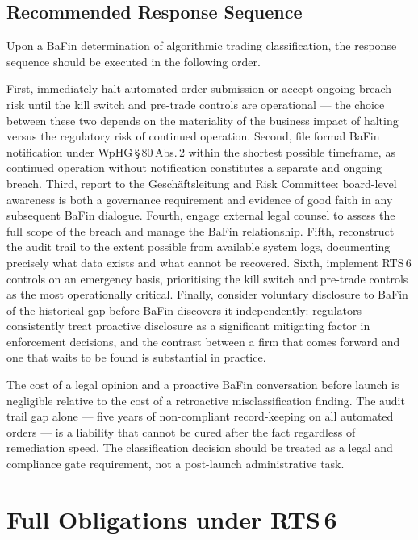 \documentclass[12pt,a4paper]{report}
\begin{document}
\subsection{Recommended Response Sequence}

Upon a BaFin determination of algorithmic trading classification, the response
sequence should be executed in the following order.

First, immediately halt automated order submission or accept ongoing breach risk until
the kill switch and pre-trade controls are operational --- the choice between these two
depends on the materiality of the business impact of halting versus the regulatory risk
of continued operation. Second, file formal BaFin notification under WpHG\,\S\,80\,Abs.\,2
within the shortest possible timeframe, as continued operation without notification
constitutes a separate and ongoing breach. Third, report to the Gesch{\"a}ftsleitung and
Risk Committee: board-level awareness is both a governance requirement and evidence of
good faith in any subsequent BaFin dialogue. Fourth, engage external legal counsel to
assess the full scope of the breach and manage the BaFin relationship. Fifth, reconstruct
the audit trail to the extent possible from available system logs, documenting precisely
what data exists and what cannot be recovered. Sixth, implement RTS\,6 controls on an
emergency basis, prioritising the kill switch and pre-trade controls as the most
operationally critical. Finally, consider voluntary disclosure to BaFin of the historical
gap before BaFin discovers it independently: regulators consistently treat proactive
disclosure as a significant mitigating factor in enforcement decisions, and the contrast
between a firm that comes forward and one that waits to be found is substantial in
practice.

\begin{regbox}
The cost of a legal opinion and a proactive BaFin conversation before launch is negligible
relative to the cost of a retroactive misclassification finding. The audit trail gap alone
--- five years of non-compliant record-keeping on all automated orders --- is a liability
that cannot be cured after the fact regardless of remediation speed. The classification
decision should be treated as a legal and compliance gate requirement, not a post-launch
administrative task.
\end{regbox}

\section{Full Obligations under RTS\,6}
\end{document}
